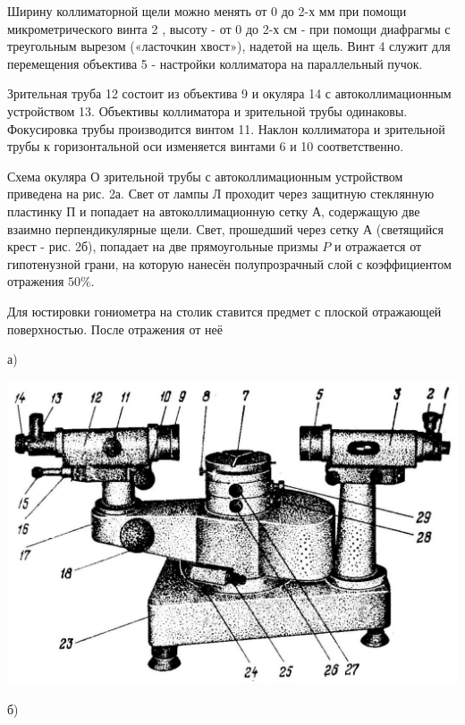 \documentclass[a4paper,12pt]{article} %
\begin{document}
Ширину коллиматорной щели можно менять от 0 до 2-х мм при помощи микрометрического винта 2 , высоту - от 0 до 2-х см - при помощи диафрагмы с треугольным вырезом («ласточкин хвост»), надетой на щель. Винт 4 служит для перемещения объектива 5 - настройки коллиматора на параллельный пучок.

Зрительная труба 12 состоит из объектива 9 и окуляра 14 с автоколлимационным устройством 13. Объективы коллиматора и зрительной трубы одинаковы. Фокусировка трубы производится винтом 11. Наклон коллиматора и зрительной трубы к горизонтальной оси изменяется винтами 6 и 10 соответственно.

Схема окуляра О зрительной трубы с автоколлимационным устройством приведена на рис. 2а. Свет от лампы Л проходит через защитную стеклянную пластинку П и попадает на автоколлимационную сетку А, содержащую две взаимно перпендикулярные щели. Свет, прошедший через сетку А (светящийся крест - рис. 2б), попадает на две прямоугольные призмы $P$ и отражается от гипотенузной грани, на которую нанесён полупрозрачный слой с коэффициентом отражения $50 \%$.

Для юстировки гониометра на столик ставится предмет с плоской отражающей поверхностью. После отражения от неё 

а)
\begin{center}
    \includegraphics[scale=0.2]{3.jpg}
\end{center}


б)
\end{document}
